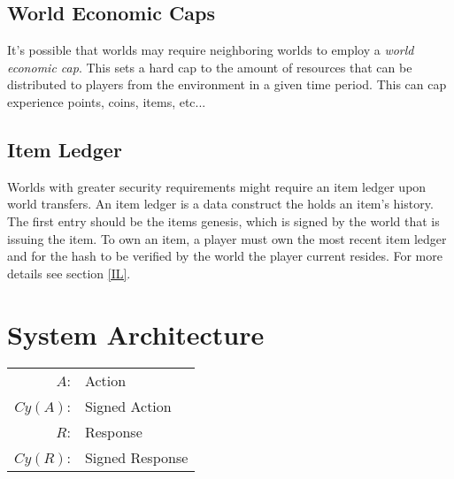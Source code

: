 \documentclass[runningheads,a4paper]{llncs}
\begin{document}
\subsection{World Economic Caps}
It's possible that worlds may require neighboring worlds to employ a \textit{world economic cap}. This sets a hard cap to the amount of resources that can be distributed to players from the environment in a given time period. This can cap experience points, coins, items, etc...

\subsection{Item Ledger}
\label{shIL}
Worlds with greater security requirements might require an item ledger upon world transfers. An item ledger is a data construct the holds an item's history. The first entry should be the items genesis, which is signed by the world that is issuing the item. To own an item, a player must own the most recent item ledger and for the hash to be verified by the world the player current resides. For more details see section \ref{IL}.









\section{System Architecture}
\begin{center}
\begin{tabular}{r l}
$A$: & Action\\ 
$Cy(A)$: & Signed Action\\
$R$: & Response\\ 
$Cy(R)$: & Signed Response\\

\end{tabular}
\end{center}
\end{document}
